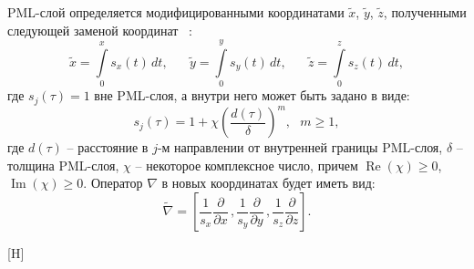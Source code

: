 \documentclass[a4paper,14pt]{article}
\makeatletter
\renewenvironment{figure}[1][\fps@figure]{
  \edef\@tempa{\noexpand\@float{figure}[#1]}
  \@tempa
  \addtocounter{foofigure}{1}
}{
  \end@float
}
\renewcommand{\Re}{\mathop{\mathrm{Re}}\nolimits}
\renewcommand{\Im}{\mathop{\mathrm{Im}}\nolimits}
\makeatother
\begin{document}
PML-слой определяется модифицированными координатами $\tilde{x}$, $\tilde{y}$, $\tilde{z}$, полученными следующей заменой координат ~\citep{wiik_dehoop_ursin}:
\begin{equation*}
	\tilde{x} = \int\limits_0^x s_x (t) \,dt ,
	\text{~~~~~}
	\tilde{y} = \int\limits_0^y s_y (t) \,dt ,
	\text{~~~~~}
	\tilde{z} = \int\limits_0^z s_z (t) \,dt ,
\end{equation*}
где $s_j(\tau) = 1$ вне PML-слоя, а внутри него может быть задано в виде:
\begin{equation}
	s_j(\tau) = 1 + \chi \left( \frac{d(\tau)}{\delta} \right)^m , \text{~~} m \geq 1 ,
	\label{eq:pml_s}
\end{equation}
где $d(\tau)$ -- расстояние в $j$-м направлении от внутренней границы PML-слоя, $\delta$ -- толщина PML-слоя, $\chi$ -- некоторое комплексное число, причем $\Re(\chi) \ge 0$, $\Im(\chi) \ge 0$. Оператор $\nabla$ в новых координатах будет иметь вид:
\begin{equation*}
	\tilde{\nabla} = \left[ \frac{1}{s_x} \frac{\partial}{\partial x} \,, \frac{1}{s_y} \frac{\partial}{\partial y} \,, \frac{1}{s_z} \frac{\partial}{\partial z} \right] .
\end{equation*}

\begin{figure}[H]
	\centering
	\caption{расчетные области: (а) без PML-слоя и (б) с PML-слоем}
	\label{fig:theory:area_3layers_PML}
\end{figure}
\end{document}
